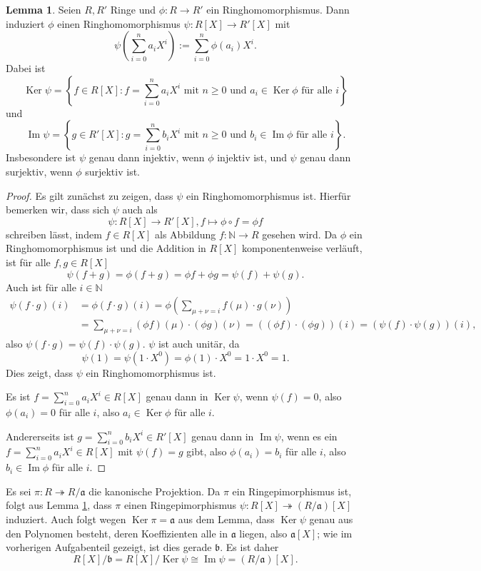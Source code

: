 \documentclass[a4paper,10pt]{article}
\theoremstyle{definition}
\newtheorem{lem}[beh]{Lemma}
\newcommand{\N}{\mathbb{N}}
\newcommand{\mf}[1]{\mathfrak{#1}}
\newcommand{\Img}{\operatorname{Im}}
\newcommand{\Ker}{\operatorname{Ker}}
\begin{document}
\begin{lem} \label{lem: ringhomo polynom}
 Seien $R, R'$ Ringe und $\phi: R \rightarrow R'$ ein Ringhomomorphismus. Dann induziert $\phi$ einen Ringhomomorphismus $\psi: R[X] \rightarrow R'[X]$ mit
  \[
   \psi\left( \sum_{i=0}^n a_i X^i \right) := \sum_{i=0}^n \phi(a_i) X^i.
  \]
  Dabei ist
  \[
   \Ker \psi = \left\{f \in R[X] : f = \sum_{i=0}^n a_i X^i \text{ mit } n \geq 0 \text{ und } a_i \in \Ker \phi \text{ für alle }i\right\}
  \]
  und
  \[
   \Img \psi = \left\{g \in R'[X] : g = \sum_{i=0}^n b_i X^i \text{ mit } n \geq 0 \text{ und } b_i \in \Img \phi \text{ für alle }i\right\}.
  \]
  Insbesondere ist $\psi$ genau dann injektiv, wenn $\phi$ injektiv ist, und $\psi$ genau dann surjektiv, wenn $\phi$ surjektiv ist.
\end{lem}
\begin{proof}
 Es gilt zunächst zu zeigen, dass $\psi$ ein Ringhomomorphismus ist. Hierfür bemerken wir, dass sich $\psi$ auch als
 \[
  \psi: R[X] \rightarrow R'[X], f \mapsto \phi \circ f = \phi f
 \]
 schreiben lässt, indem $f \in R[X]$ als Abbildung $f: \N \rightarrow R$ gesehen wird. Da $\phi$ ein Ringhomomorphismus ist und die Addition in $R[X]$ komponentenweise verläuft, ist für alle $f,g \in R[X]$ 
 \[
  \psi(f+g) = \phi (f+g) = \phi f + \phi g = \psi(f) + \psi(g).
 \]
 Auch ist für alle $i \in \N$
 \begin{align*}
  \psi(f \cdot g)(i)
  &= \phi(f \cdot g)(i)
  = \phi\left( \sum_{\mu+\nu=i} f(\mu) \cdot g(\nu) \right) \\
  &= \sum_{\mu+\nu=i} (\phi f)(\mu) \cdot (\phi g)(\nu)
  = ((\phi f) \cdot (\phi g))(i)
  = (\psi(f) \cdot \psi(g))(i),
 \end{align*}
 also $\psi(f \cdot g) = \psi(f) \cdot \psi(g)$. $\psi$ ist auch unitär, da
  \[
   \psi(1) = \psi\left(1 \cdot X^0\right) = \phi(1) \cdot X^0 = 1 \cdot X^0 = 1.
  \]
 Dies zeigt, dass $\psi$ ein Ringhomomorphismus ist.
 
 Es ist $f = \sum_{i=0}^n a_i X^i \in R[X]$ genau dann in $\Ker \psi$, wenn $\psi(f) = 0$, also $\phi(a_i) = 0$ für alle $i$, also $a_i \in \Ker \phi$ für alle $i$.
 
 Andererseits ist $g = \sum_{i=0}^n b_i X^i \in R'[X]$ genau dann in $\Img \psi$, wenn es ein $f = \sum_{i=0}^n a_i X^i \in R[X]$ mit $\psi(f) = g$ gibt, also $\phi(a_i) = b_i$ für alle $i$, also $b_i \in \Img \phi$ für alle $i$.
\end{proof}

Es sei $\pi : R \twoheadrightarrow R/\mf{a}$ die kanonische Projektion. Da $\pi$ ein Ringepimorphismus ist, folgt aus Lemma \ref{lem: ringhomo polynom}, dass $\pi$ einen Ringepimorphismus $\psi: R[X] \twoheadrightarrow (R/\mf{a})[X]$ induziert. Auch folgt wegen $\Ker \pi = \mf{a}$ aus dem Lemma, dass $\Ker \psi$ genau aus den Polynomen besteht, deren Koeffizienten alle in $\mf{a}$ liegen, also $\mf{a}[X]$; wie im vorherigen Aufgabenteil gezeigt, ist dies gerade $\mf{b}$. Es ist daher
\[
 R[X]/\mf{b} = R[X]/\Ker\psi \cong \Img\psi = (R/\mf{a})[X].
\]
\end{document}
